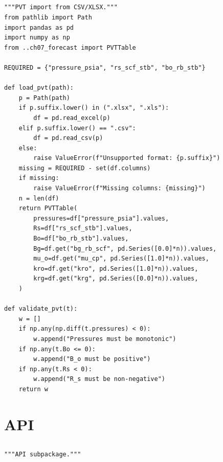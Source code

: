 \documentclass[10pt,a4paper,openany]{book}
\begin{document}
\chapter{}
\begin{lstlisting}
"""PVT import from CSV/XLSX."""
from pathlib import Path
import pandas as pd
import numpy as np
from ..ch07_forecast import PVTTable

REQUIRED = {"pressure_psia", "rs_scf_stb", "bo_rb_stb"}

def load_pvt(path):
    p = Path(path)
    if p.suffix.lower() in (".xlsx", ".xls"):
        df = pd.read_excel(p)
    elif p.suffix.lower() == ".csv":
        df = pd.read_csv(p)
    else:
        raise ValueError(f"Unsupported format: {p.suffix}")
    missing = REQUIRED - set(df.columns)
    if missing:
        raise ValueError(f"Missing columns: {missing}")
    n = len(df)
    return PVTTable(
        pressures=df["pressure_psia"].values,
        Rs=df["rs_scf_stb"].values,
        Bo=df["bo_rb_stb"].values,
        Bg=df.get("bg_rb_scf", pd.Series([0.0]*n)).values,
        mu_o=df.get("mu_cp", pd.Series([1.0]*n)).values,
        kro=df.get("kro", pd.Series([1.0]*n)).values,
        krg=df.get("krg", pd.Series([0.0]*n)).values,
    )

def validate_pvt(t):
    w = []
    if np.any(np.diff(t.pressures) < 0):
        w.append("Pressures must be monotonic")
    if np.any(t.Bo <= 0):
        w.append("B_o must be positive")
    if np.any(t.Rs < 0):
        w.append("R_s must be non-negative")
    return w
\end{lstlisting}

\part{API}

\chapter{}
\begin{lstlisting}
"""API subpackage."""
\end{lstlisting}
\end{document}
